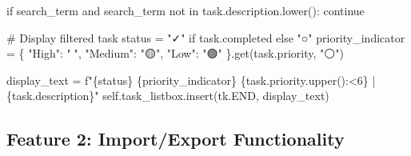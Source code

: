 \documentclass[
  letterpaper,
  DIV=11,
  numbers=noendperiod,
  oneside]{scrreprt}
\newenvironment{Shaded}{}{}
\newcommand{\CommentTok}[1]{\textcolor[rgb]{0.42,0.45,0.49}{#1}}
\newcommand{\ControlFlowTok}[1]{\textcolor[rgb]{0.84,0.23,0.29}{#1}}
\newcommand{\KeywordTok}[1]{\textcolor[rgb]{0.84,0.23,0.29}{#1}}
\newcommand{\NormalTok}[1]{\textcolor[rgb]{0.14,0.16,0.18}{#1}}
\newcommand{\OperatorTok}[1]{\textcolor[rgb]{0.14,0.16,0.18}{#1}}
\newcommand{\SpecialCharTok}[1]{\textcolor[rgb]{0.00,0.36,0.77}{#1}}
\newcommand{\SpecialStringTok}[1]{\textcolor[rgb]{0.01,0.18,0.38}{#1}}
\newcommand{\StringTok}[1]{\textcolor[rgb]{0.01,0.18,0.38}{#1}}
\newcommand{\VariableTok}[1]{\textcolor[rgb]{0.89,0.38,0.04}{#1}}
\begin{document}
\begin{Shaded}
\begin{Highlighting}[]
        \ControlFlowTok{if}\NormalTok{ search\_term }\KeywordTok{and}\NormalTok{ search\_term }\KeywordTok{not} \KeywordTok{in}\NormalTok{ task.description.lower():}
            \ControlFlowTok{continue}
        
        \CommentTok{\# Display filtered task}
\NormalTok{        status }\OperatorTok{=} \StringTok{"✓"} \ControlFlowTok{if}\NormalTok{ task.completed }\ControlFlowTok{else} \StringTok{"○"}
\NormalTok{        priority\_indicator }\OperatorTok{=}\NormalTok{ \{}
            \StringTok{"High"}\NormalTok{: }\StringTok{"🔴"}\NormalTok{, }\StringTok{"Medium"}\NormalTok{: }\StringTok{"🟡"}\NormalTok{, }\StringTok{"Low"}\NormalTok{: }\StringTok{"🟢"}
\NormalTok{        \}.get(task.priority, }\StringTok{"⚪"}\NormalTok{)}
        
\NormalTok{        display\_text }\OperatorTok{=} \SpecialStringTok{f"}\SpecialCharTok{\{}\NormalTok{status}\SpecialCharTok{\}}\SpecialStringTok{ }\SpecialCharTok{\{}\NormalTok{priority\_indicator}\SpecialCharTok{\}}\SpecialStringTok{ }\SpecialCharTok{\{}\NormalTok{task}\SpecialCharTok{.}\NormalTok{priority}\SpecialCharTok{.}\NormalTok{upper()}\SpecialCharTok{:\textless{}6\}}\SpecialStringTok{ | }\SpecialCharTok{\{}\NormalTok{task}\SpecialCharTok{.}\NormalTok{description}\SpecialCharTok{\}}\SpecialStringTok{"}
        \VariableTok{self}\NormalTok{.task\_listbox.insert(tk.END, display\_text)}
\end{Highlighting}
\end{Shaded}

\subsection{Feature 2: Import/Export
Functionality}\label{feature-2-importexport-functionality}
\end{document}
